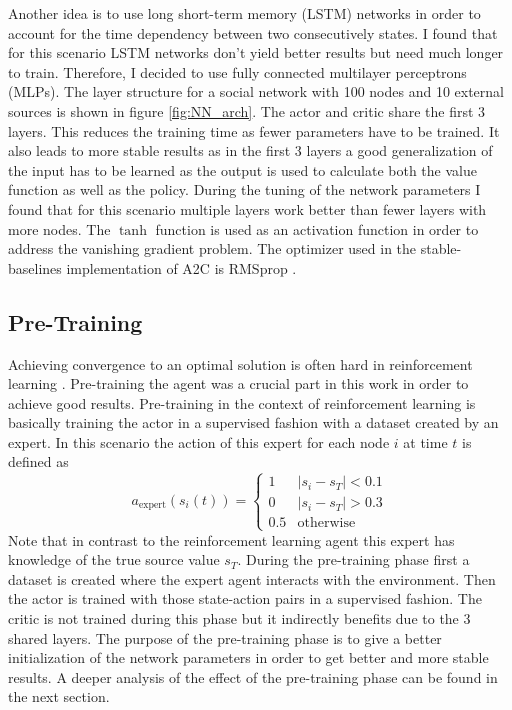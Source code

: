 \documentclass[11pt, a4paper]{article}
\begin{document}
Another idea is to use long short-term memory (LSTM) networks in order to account for the time dependency between two consecutively states. I found that for this scenario LSTM networks don't yield better results but need much longer to train. Therefore, I decided to use fully connected multilayer perceptrons (MLPs). The layer structure for a social network with 100 nodes and 10 external sources is shown in figure \ref{fig:NN_arch}. The actor and critic share the first 3 layers. This reduces the training time as fewer parameters have to be trained. It also leads to more stable results as in the first 3 layers a good generalization of the input has to be learned as the output is used to calculate both the value function as well as the policy. During the tuning of the network parameters I found that for this scenario multiple layers work better than fewer layers with more nodes. The $\tanh$ function is used as an activation function in order to address the vanishing gradient problem. The optimizer used in the stable-baselines implementation of A2C is RMSprop \cite{RMSprop}.

\subsection{Pre-Training}
Achieving convergence to an optimal solution is often hard in reinforcement learning \cite{rlblogpost}. Pre-training the agent was a crucial part in this work in order to achieve good results. Pre-training in the context of reinforcement learning is basically training the actor in a supervised fashion with a dataset created by an expert. In this scenario the action of this expert for each node $i$ at time $t$ is defined as
%
\begin{equation}
	a_{\text{expert}}(s_i(t)) = \begin{cases}
			1 & |s_i - s_T| < 0.1 \\
			0 & |s_i - s_T| > 0.3 \\
			0.5 & \text{otherwise}
		\end{cases}
\end{equation}
%
Note that in contrast to the reinforcement learning agent this expert has knowledge of the true source value $s_T$. During the pre-training phase first a dataset is created where the expert agent interacts with the environment. Then the actor is trained with those state-action pairs in a supervised fashion. The critic is not trained during this phase but it indirectly benefits due to the 3 shared layers. The purpose of the pre-training phase is to give a better initialization of the network parameters in order to get better and more stable results. A deeper analysis of the effect of the pre-training phase can be found in the next section.
\end{document}
